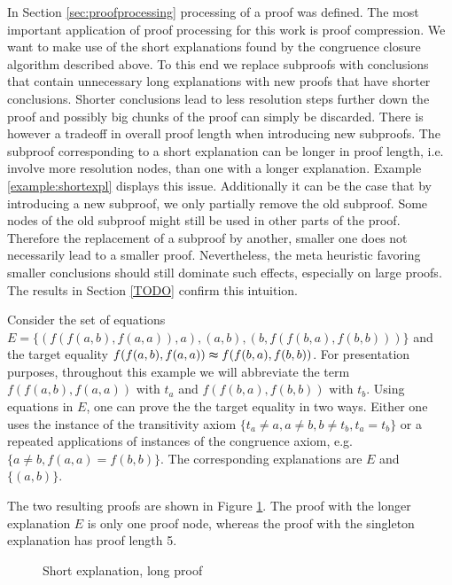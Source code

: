 In Section \ref{sec:proofprocessing} processing of a proof was defined.
The most important application of proof processing for this work is proof compression.
We want to make use of the short explanations found by the congruence closure algorithm described above.
To this end we replace subproofs with conclusions that contain unnecessary long explanations with new proofs that have shorter conclusions.
Shorter conclusions lead to less resolution steps further down the proof and possibly big chunks of the proof can simply be discarded.
There is however a tradeoff in overall proof length when introducing new subproofs.
The subproof corresponding to a short explanation can be longer in proof length, i.e. involve more resolution nodes, than one with a longer explanation.
Example \ref{example:shortexpl} displays this issue.
Additionally it can be the case that by introducing a new subproof, we only partially remove the old subproof.
Some nodes of the old subproof might still be used in other parts of the proof.
Therefore the replacement of a subproof by another, smaller one does not necessarily lead to a smaller proof.
Nevertheless, the meta heuristic favoring smaller conclusions should still dominate such effects, especially on large proofs.
The results in Section \ref{TODO} confirm this intuition.

\begin{example}
\label{example:shortexpl}
Consider the set of equations $E = \{(f(f(a,b),f(a,a)),a),(a,b),(b,f(f(b,a),f(b,b)))\}$ and the target equality $f(f(a,b),f(a,a)) \thickapprox f(f(b,a),f(b,b))$.
For presentation purposes, throughout this example we will abbreviate the term $f(f(a,b),f(a,a))$ with $t_a$ and $f(f(b,a),f(b,b))$ with $t_b$.
Using equations in $E$, one can prove the the target equality in two ways.
Either one uses the instance of the transitivity axiom $\{t_a \neq a, a \neq b, b \neq t_b, t_a = t_b\}$ or a repeated applications of instances of the congruence axiom, e.g. $\{a \neq b, f(a,a) = f(b,b)\}$.
The corresponding explanations are $E$ and $\{(a,b)\}$.

The two resulting proofs are shown in Figure \ref{fig:short_expl_proof}.
The proof with the longer explanation $E$ is only one proof node, whereas the proof with the singleton explanation has proof length 5.

%
%
%

\begin{figure}[!h]
%
\caption{Short explanation, long proof}
\label{fig:short_expl_proof}
\end{figure}

\end{example}

